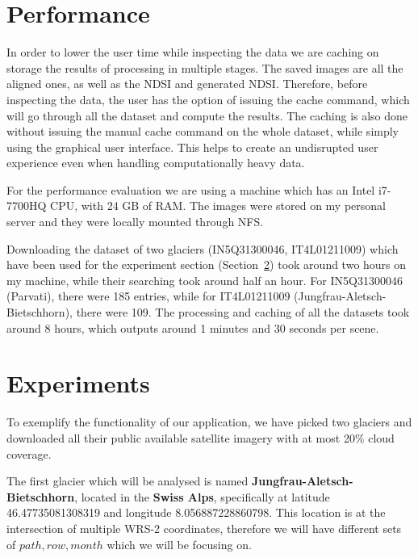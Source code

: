 \documentclass[12pt, a4paper]{report}
\begin{document}
	
	\section{Performance}
	\label{seq:performance}
	
	\par In order to lower the user time while inspecting the data we are caching on storage the results of processing in multiple stages. The saved images are all the aligned ones, as well as the NDSI and generated NDSI. Therefore, before inspecting the data, the user has the option of issuing the cache command, which will go through all the dataset and compute the results. The caching is also done without issuing the manual cache command on the whole dataset, while simply using the graphical user interface. This helps to create an undisrupted user experience even when handling computationally heavy data.
	
	For the performance evaluation we are using a machine which has an Intel i7-7700HQ CPU, with 24 GB of RAM. The images were stored on my personal server and they were locally mounted through NFS.
	
	Downloading the dataset of two glaciers (IN5Q31300046, IT4L01211009) which have been used for the experiment section (Section~\ref{seq:experiments}) took around two hours on my machine, while their searching took around half an hour. For IN5Q31300046 (Parvati), there were 185 entries, while for IT4L01211009 (Jungfrau-Aletsch-Bietschhorn), there were 109. The processing and caching of all the datasets took around 8 hours, which outputs around 1 minutes and 30 seconds per scene.
	
	\section{Experiments}
	\label{seq:experiments}
	
	\par To exemplify the functionality of our application, we have picked two glaciers and downloaded all their public available satellite imagery with at most 20\% cloud coverage. 
	
	\par The first glacier which will be analysed is named \textbf{Jungfrau-Aletsch-Bietschhorn}, located in the \textbf{Swiss Alps}, specifically at latitude 46.47735081308319 and longitude 8.056887228860798. This location is at the intersection of multiple WRS-2 coordinates, therefore we will have different sets of \(path, row, month\) which we will be focusing on.
	
\end{document}
